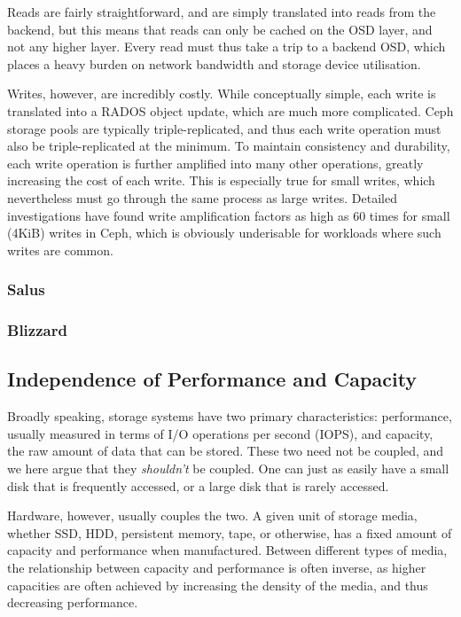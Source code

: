 Reads are fairly straightforward, and are simply translated into reads from the
backend, but this means that reads can only be cached on the OSD layer, and
not any higher layer. Every read must thus take a trip to a backend OSD, which
places a heavy burden on network bandwidth and storage device utilisation.

Writes, however, are incredibly costly. While conceptually simple, each write is
translated into a RADOS object update, which are much more complicated.  Ceph
storage pools are typically triple-replicated, and thus each write operation
must also be triple-replicated at the minimum. To maintain consistency and
durability, each write operation is further amplified into many other
operations, greatly increasing the cost of each write. This is especially true
for small writes, which nevertheless must go through the same process as large
writes. Detailed investigations\cite{lee2017understanding,aghayev2019file} have
found write amplification factors as high as 60 times for small (4KiB) writes in
Ceph, which is obviously underisable for workloads where such writes are common.

\subsubsection{Salus}


\subsubsection{Blizzard}


\subsection{Independence of Performance and Capacity}

Broadly speaking, storage systems have two primary characteristics: performance,
usually measured in terms of I/O operations per second (IOPS), and capacity,
the raw amount of data that can be stored. These two need not be coupled, and
we here argue that they \textit{shouldn't} be coupled. One can just as easily
have a small disk that is frequently accessed, or a large disk that is rarely
accessed.

Hardware, however, usually couples the two. A given unit of storage media,
whether SSD, HDD, persistent memory, tape, or otherwise, has a fixed amount of
capacity and performance when manufactured. Between different types of media,
the relationship between capacity and performance is often inverse, as higher
capacities are often achieved by increasing the density of the media, and thus
decreasing performance.

